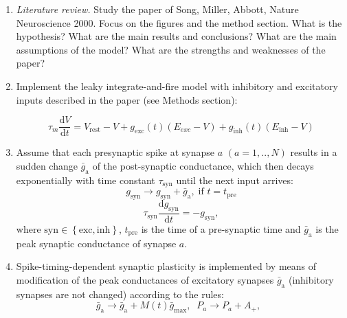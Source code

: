 \documentclass[12pt]{article}
\newcommand{\tderiv}[1]{\frac{\mathrm{d}#1}{\mathrm{d}t}}
\begin{document}
\begin{enumerate}
    \item \textit{Literature review.} Study the paper of Song, Miller,
        Abbott, Nature Neuroscience 2000. Focus on the figures and the method
        section. What is the hypothesis? What are the main results
        and conclusions? What are the main assumptions of the model?
        What are the strengths and weaknesses of the paper?

    \item
        Implement the leaky integrate-and-fire model with inhibitory
        and excitatory inputs described in
        the paper (see Methods section):

        \begin{equation}
            \tau_m
            \tderiv{V}=V_\mathrm{rest}-V+g_\mathrm{exc}(t)(E_{exc}-V)+g_\mathrm{inh}(t)(E_\mathrm{inh}-V)
            \label{eq:lif}
        \end{equation}
    \item Assume that each presynaptic spike at synapse $a$ $(a=1,..,N)$
          results in a sudden change $\bar{g}_\mathrm{a}$ of the post-synaptic
          conductance, which then decays exponentially with time constant
          $\tau_\mathrm{syn}$ until the next input arrives:
        \begin{equation}
            g_\mathrm{syn} \rightarrow g_\mathrm{syn} +
            \bar{g}_\mathrm{a},\;\text{if } t =
            t_\mathrm{pre}
            \label{eq:conductance2}
        \end{equation}
        \begin{equation}
            \tau_\mathrm{syn} \tderiv{g_\mathrm{syn}} =
            -g_\mathrm{syn},
            \label{eq:conductance2}
        \end{equation}
        where $\mathrm{syn} \in  \left\{\mathrm{exc},
        \mathrm{inh}\right\}$, $t_\mathrm{pre}$ is the time of a pre-synaptic
        time and $\bar{g}_\mathrm{a}$ is the peak synaptic conductance of
        synapse $a$.
    \item  Spike-timing-dependent synaptic plasticity is implemented by
        means of modification of the peak conductances
        of excitatory synapses $\bar{g}_\mathrm{a}$ (inhibitory
        synapses are not changed) according
        to the rules:
        \begin{equation}
            \bar{g}_\mathrm{a} \rightarrow
            \bar{g}_\mathrm{a}+M(t)\bar{g}_\mathrm{max},\; \;
            P_a \rightarrow P_a + A_+, \; \;

\end{equation}
\end{enumerate}
\end{document}
